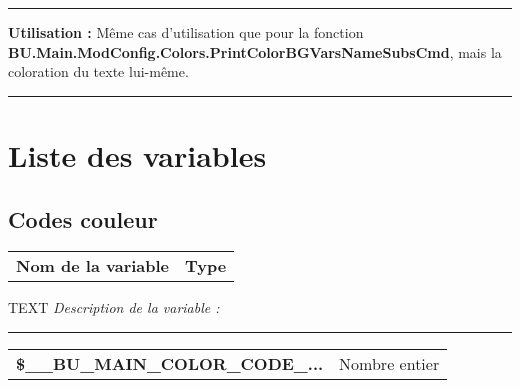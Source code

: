 \documentclass[a4paper,10pt]{article}
\begin{document}

\par\noindent\rule{\textwidth}{0.4pt}

\begin{justify}
    \textbf{Utilisation :} Même cas d'utilisation que pour la fonction \textbf{\color{func}BU.Main.ModConfig.Colors.PrintColorBGVarsNameSubsCmd}, mais la coloration du texte lui-même.
\end{justify}








\color{sec1}\par\noindent\rule{\textwidth}{0.4pt}\color{text}

\color{sec1}
\section{Liste des variables}\color{text}

\color{sec2}
\subsection{Codes couleur}\color{text}

\begin{justify}
    \begin{tabular}{l|l}
        \textbf{Nom de la variable} & \textbf{Type}
    \end{tabular}
\end{justify}

\begin{justify}TEXT
    \textit{Description de la variable :}
\end{justify}


\par\noindent\rule{\textwidth}{0.4pt}

\begin{justify}
    \begin{tabular}{l|l}
        \textbf{\color{vars}\$\_\_BU\_MAIN\_COLOR\_CODE\_...}  & Nombre entier\\
    \end{tabular}
\end{justify}
\end{document}
